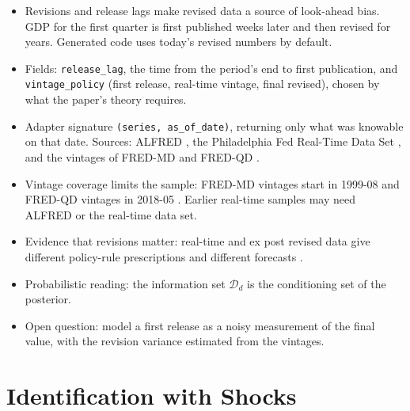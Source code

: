   \begin{itemize}
  \tightlist
  \item
    Revisions and release lags make revised data a source of look-ahead
    bias. GDP for the first quarter is first published weeks later and then
    revised for years. Generated code uses today's revised numbers by
    default.
  \item
    Fields: \texttt{release\_lag}, the time from the period's end to first
    publication, and \texttt{vintage\_policy} (first release, real-time
    vintage, final revised), chosen by what the paper's theory requires.
  \item
    Adapter signature \texttt{(series,\ as\_of\_date)}, returning only what
    was knowable on that date. Sources: ALFRED \cite{alfred}, the
    Philadelphia Fed Real-Time Data Set \cite{croushore2001real}, and the
    vintages of FRED-MD and FRED-QD \cite{mccracken2016fredmd,
    mccracken2021fredqd}.
  \item
    Vintage coverage limits the sample: FRED-MD vintages start in 1999-08
    and FRED-QD vintages in 2018-05 \cite{fredmddb}. Earlier real-time
    samples may need ALFRED or the real-time data set.
  \item
    Evidence that revisions matter: real-time and ex post revised data give
    different policy-rule prescriptions \cite{orphanides2001monetary} and
    different forecasts \cite{croushore2001real,croushore2011frontiers}.
  \item
    Probabilistic reading: the information set \(\mathcal{D}_d\) is the
    conditioning set of the posterior.
  \item
    Open question: model a first release as a noisy measurement of the
    final value, with the revision variance estimated from the vintages.
  \end{itemize}

  \section{Identification with Shocks}\label{sec:identification_with_shocks}

